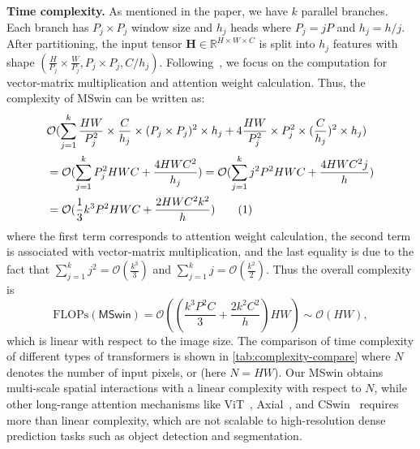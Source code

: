 \documentclass[runningheads]{llncs}
\newcommand\numberthis{\addtocounter{equation}{1}\tag{\theequation}}
\begin{document}
\noindent\textbf{Time complexity. }As mentioned in the paper, we have $k$ parallel branches. Each branch has $P_j\times P_j$ window size and $h_j$ heads where $P_j=jP$ and $h_j=h/j$. After partitioning, the input tensor $\mathbf{H}\in\mathbb{R}^{H\times W\times C}$ is split into $h_j$ features with shape $(\frac{H}{P_j}\times\frac{W}{P_j},P_j\times P_j,C/h_j)$. Following~\cite{liu2021swin}, we focus on the computation for vector-matrix multiplication and attention weight calculation. Thus, the complexity of MSwin can be written as:
\begin{align*}
    &\mathcal{O}(\sum_{j=1}^k \frac{HW}{P_j^2}\times\frac{C}{h_j}\times (P_j\times P_j)^2\times h_j+4\frac{HW}{P_j^2}\times P_j^2\times (\frac{C}{h_j})^2\times h_j)\\
    &=\mathcal{O}(\sum_{j=1}^k P_j^2HWC+\frac{4HWC^2}{h_j})=\mathcal{O}(\sum_{j=1}^k j^2P^2HWC+\frac{4HWC^2j}{h})\\
    &=\mathcal{O}(\frac{1}{3}k^3P^2HWC+\frac{2HWC^2k^2}{h}) \numberthis \label{0}
\end{align*}
where the first term corresponds to attention weight calculation, the second term is associated with vector-matrix multiplication, and the last equality is due to the fact that $\sum_{j=1}^k j^2=\mathcal{O}(\frac{k^3}{3})$ and $\sum_{j=1}^k j=\mathcal{O}(\frac{k^2}{2})$. Thus the overall complexity is 
\begin{equation}
\label{eq:mswin-complexity}
\mathrm{FLOPs}(\mathsf{MSwin})=\mathcal{O}((\frac{k^3P^2C}{3}+\frac{2k^2C^2}{h})HW)\sim \mathcal{O}(HW),
\end{equation}
which is linear with respect to the image size. The comparison of time complexity of different types of transformers is shown in \cref{tab:complexity-compare} where $N$ denotes the number of input pixels, or  (here $N=HW$). Our MSwin obtains multi-scale spatial interactions with a linear complexity with respect to $N$, while other long-range attention mechanisms like ViT~\cite{dosovitskiy2020image}, Axial~\cite{wang2020axial}, and CSwin~\cite{dong2021cswin} requires more than linear complexity, which are not scalable to high-resolution dense prediction tasks such as object detection and segmentation.
\end{document}
